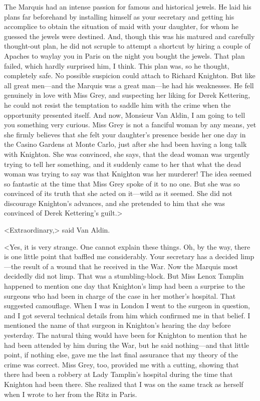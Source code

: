 The Marquis had an intense passion for famous and historical jewels. He laid his plans far beforehand by installing himself as your secretary and getting his accomplice to obtain the situation of maid with your daughter, for whom he guessed the jewels were destined. And, though this was his matured and carefully thought-out plan, he did not scruple to attempt a shortcut by hiring a couple of Apaches to waylay you in Paris on the night you bought the jewels. That plan failed, which hardly surprised him, I think. This plan was, so he thought, completely safe. No possible suspicion could attach to Richard Knighton. But like all great men—and the Marquis was a great man—he had his weaknesses. He fell genuinely in love with Miss Grey, and suspecting her liking for Derek Kettering, he could not resist the temptation to saddle him with the crime when the opportunity presented itself. And now, Monsieur Van Aldin, I am going to tell you something very curious. Miss Grey is not a fanciful woman by any means, yet she firmly believes that she felt your daughter's presence beside her one day in the Casino Gardens at Monte Carlo, just after she had been having a long talk with Knighton. She was convinced, she says, that the dead woman was urgently trying to tell her something, and it suddenly came to her that what the dead woman was trying to say was that Knighton was her murderer! The idea seemed so fantastic at the time that Miss Grey spoke of it to no one. But she was so convinced of its truth that she acted on it—wild as it seemed. She did not discourage Knighton's advances, and she pretended to him that she was convinced of Derek Kettering's guilt.>

<Extraordinary,> said Van Aldin.

<Yes, it is very strange. One cannot explain these things. Oh, by the way, there is one little point that baffled me considerably. Your secretary has a decided limp—the result of a wound that he received in the War. Now the Marquis most decidedly did not limp. That was a stumbling-block. But Miss Lenox Tamplin happened to mention one day that Knighton's limp had been a surprise to the surgeons who had been in charge of the case in her mother's hospital. That suggested camouflage. When I was in London I went to the surgeon in question, and I got several technical details from him which confirmed me in that belief. I mentioned the name of that surgeon in Knighton's hearing the day before yesterday. The natural thing would have been for Knighton to mention that he had been attended by him during the War, but he said nothing—and that little point, if nothing else, gave me the last final assurance that my theory of the crime was correct. Miss Grey, too, provided me with a cutting, showing that there had been a robbery at Lady Tamplin's hospital during the time that Knighton had been there. She realized that I was on the same track as herself when I wrote to her from the Ritz in Paris.

